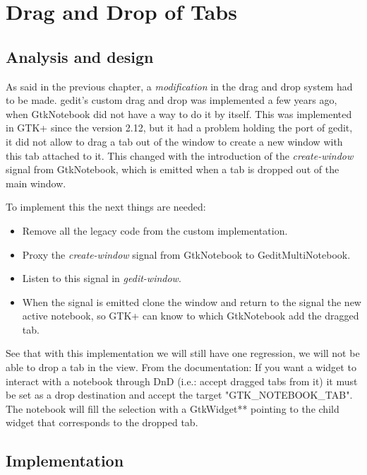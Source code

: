 
\chapter{Drag and Drop of Tabs}


\section{Analysis and design}

As said in the previous chapter, a \emph{modification} in the drag and drop system had to be made. gedit's custom drag and drop was implemented a few years ago, when GtkNotebook did not have a way to do it by itself. This was implemented in GTK+ since the version 2.12, but it had a problem holding the port of gedit, it did not allow to drag a tab out of the window to create a new window with this tab attached to it. This changed with the introduction of the \emph{create-window} signal from GtkNotebook, which is emitted when a tab is dropped out of the main window.

To implement this the next things are needed:
\begin{itemize}
  \item Remove all the legacy code from the custom implementation.
  \item Proxy the \emph{create-window} signal from GtkNotebook to GeditMultiNotebook.
  \item Listen to this signal in \emph{gedit-window}.
  \item When the signal is emitted clone the window and return to the signal the new active notebook, so GTK+ can know to which GtkNotebook add the dragged tab.
\end{itemize}

See that with this implementation we will still have one regression, we will not be able to drop a tab in the view. From the documentation: If you want a widget to interact with a notebook through DnD (i.e.: accept dragged tabs from it) it must be set as a drop destination and accept the target "GTK\_NOTEBOOK\_TAB". The notebook will fill the selection with a GtkWidget** pointing to the child widget that corresponds to the dropped tab.

\section{Implementation}


